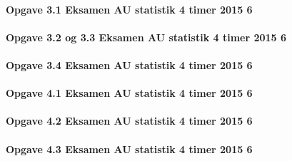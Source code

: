\documentclass[]{book}
\let\oldparagraph\paragraph
\renewcommand{\paragraph}[1]{\oldparagraph{#1}\mbox{}}
\begin{document}
\hypertarget{opgave-3.1-eksamen-au-statistik-4-timer-2015-6}{%
\paragraph{Opgave 3.1 Eksamen AU statistik 4 timer 2015 6}\label{opgave-3.1-eksamen-au-statistik-4-timer-2015-6}}

\hypertarget{opgave-3.2-og-3.3-eksamen-au-statistik-4-timer-2015-6}{%
\paragraph{Opgave 3.2 og 3.3 Eksamen AU statistik 4 timer 2015 6}\label{opgave-3.2-og-3.3-eksamen-au-statistik-4-timer-2015-6}}

\hypertarget{opgave-3.4-eksamen-au-statistik-4-timer-2015-6}{%
\paragraph{Opgave 3.4 Eksamen AU statistik 4 timer 2015 6}\label{opgave-3.4-eksamen-au-statistik-4-timer-2015-6}}

\hypertarget{opgave-4.1-eksamen-au-statistik-4-timer-2015-6}{%
\paragraph{Opgave 4.1 Eksamen AU statistik 4 timer 2015 6}\label{opgave-4.1-eksamen-au-statistik-4-timer-2015-6}}

\hypertarget{opgave-4.2-eksamen-au-statistik-4-timer-2015-6}{%
\paragraph{Opgave 4.2 Eksamen AU statistik 4 timer 2015 6}\label{opgave-4.2-eksamen-au-statistik-4-timer-2015-6}}

\hypertarget{opgave-4.3-eksamen-au-statistik-4-timer-2015-6}{%
\paragraph{Opgave 4.3 Eksamen AU statistik 4 timer 2015 6}\label{opgave-4.3-eksamen-au-statistik-4-timer-2015-6}}


\end{document}

